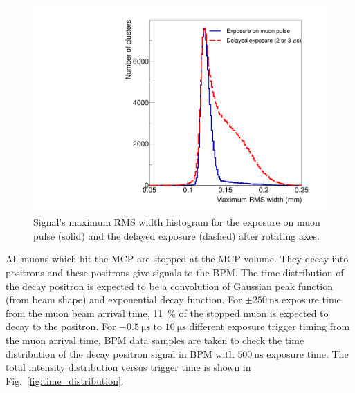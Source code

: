 \documentclass[preprint,3p,twocolumn]{elsarticle}
\begin{document}
\begin{figure}[tb]
	\begin{minipage}[t]{60mm}
		\includegraphics[width=1.30\textwidth, height=1.1\textwidth]{figure/RMS_legend_v2.pdf}
	\end{minipage}
	\caption{Signal's maximum RMS width histogram for the exposure on muon pulse (solid) and the delayed exposure (dashed) after rotating axes.}\vspace{-0.3cm}
	\label{fig:positron_width}
\end{figure}

All muons which hit the MCP are stopped at the MCP volume. They decay into positrons and these positrons give signals to the BPM.
The time distribution of the decay positron is expected to be a convolution of Gaussian peak function (from beam shape) and exponential decay function.
For $\pm\SI{250}{\nano\s}$ exposure time from the muon beam arrival time, \SI{11}{\percent} of the stopped muon is expected to decay to the positron.
For $\SI{-0.5}{\micro\s}$ to $\SI{10}{\micro\s}$ different exposure trigger timing from the muon arrival time, BPM data samples are taken to check the time distribution of the decay positron signal in BPM with $\SI{500}{\nano\s}$ exposure time.
The total intensity distribution versus trigger time is shown in Fig.~\ref{fig:time_distribution}. 
\end{document}
